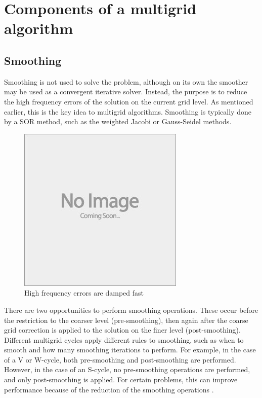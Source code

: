 







\section{Components of a multigrid algorithm}

\subsection{Smoothing}

Smoothing is not used to solve the problem, although on its own the smoother may be used as a convergent iterative solver.
Instead, the purpose is to reduce the high frequency errors of the solution on the current grid level.
As mentioned earlier, this is the key idea to multigrid algorithms.
Smoothing is typically done by a SOR method, such as the weighted Jacobi or Gauss-Seidel methods.

\begin{figure}
	\centering
	\includegraphics[draft]{images/placeholder}
	\caption{High frequency errors are damped fast}
\end{figure}


There are two opportunities to perform smoothing operations.
These occur before the restriction to the coarser level (pre-smoothing), then again after the coarse grid correction is applied to the solution on the finer level (post-smoothing).
Different multigrid cycles apply different rules to smoothing, such as when to smooth and how many smoothing iterations to perform.
For example, in the case of a V or W-cycle, both pre-smoothing and post-smoothing are performed.
However, in the case of an S-cycle, no pre-smoothing operations are performed, and only post-smoothing is applied.
For certain problems, this can improve performance because of the reduction of the smoothing operations \cite{iyengar}.


